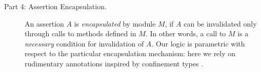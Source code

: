 \begin{description}
  
\vertsp


\item[Part 4: Assertion Encapsulation.]  
An assertion $A$  is
\emph{encapsulated} by  module $M$, if  $A$ can be invalidated only through
calls to methods defined in $M$.
  In other words, a  call to  $M$  is a \emph{necessary} condition for
invalidation of $A$.
Our \Nec logic  is parametric with respect to the 
particular encapsulation
mechanism: here we rely on rudimentary annotations inspired by confinement types
\cite{confined}.

\vertsp
{}
 
\end{description} 




